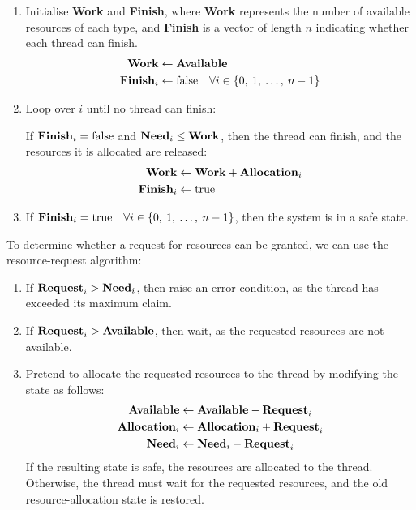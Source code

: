 \documentclass{article}
\begin{document}
\begin{enumerate}
    \item Initialise \textbf{Work} and \textbf{Finish}, where
          \textbf{Work} represents the number of available resources of
          each type, and \textbf{Finish} is a vector of length \(n\)
          indicating whether each thread can finish.
          \begin{align*}
              \text{\textbf{Work}}     & \gets \text{\textbf{Available}}                                                 \\
              \text{\textbf{Finish}}_i & \gets \text{false} \quad \forall i \in \left\{ 0,\: 1,\: \ldots,\: n-1 \right\}
          \end{align*}
    \item Loop over \(i\) until no thread can finish:

          If \(\text{\textbf{Finish}}_i = \text{false}\) and
          \(\text{\textbf{Need}}_i \leq \text{\textbf{Work}}\), then
          the thread can finish, and the resources it is allocated are
          released:
          \begin{align*}
              \text{\textbf{Work}}     & \gets \text{\textbf{Work}} + \text{\textbf{Allocation}}_i \\
              \text{\textbf{Finish}}_i & \gets \text{true}
          \end{align*}
    \item If \(\text{\textbf{Finish}}_i = \text{true} \quad \forall i
          \in \left\{ 0,\: 1,\: \ldots,\: n-1 \right\}\), then the
          system is in a safe state.
\end{enumerate}
To determine whether a request for resources can be granted, we can use
the resource-request algorithm:
\begin{enumerate}
    \item If \(\text{\textbf{Request}}_i > \text{\textbf{Need}}_i\),
          then raise an error condition, as the thread has exceeded its
          maximum claim.
    \item If \(\text{\textbf{Request}}_i > \text{\textbf{Available}}\),
          then wait, as the requested resources are not available.
    \item Pretend to allocate the requested resources to the thread by
          modifying the state as follows:
          \begin{align*}
              \text{\textbf{Available}}    & \gets \text{\textbf{Available}} - \text{\textbf{Request}}_i    \\
              \text{\textbf{Allocation}}_i & \gets \text{\textbf{Allocation}}_i + \text{\textbf{Request}}_i \\
              \text{\textbf{Need}}_i       & \gets \text{\textbf{Need}}_i - \text{\textbf{Request}}_i
          \end{align*}
          If the resulting state is safe, the resources are allocated to the thread. Otherwise, the thread must wait for the requested resources,
          and the old resource-allocation state is restored.
\end{enumerate}
\end{document}
